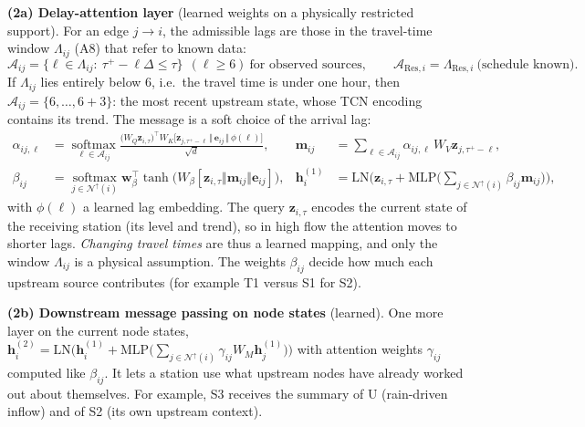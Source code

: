 \textbf{(2a) Delay-attention layer} (learned weights on a physically restricted support). For an
edge $j\to i$, the admissible lags are those in the travel-time window $\Lambda_{ij}$ (A8) that refer
to known data:
\begin{equation}
\mathcal{A}_{ij}=\big\{\ell\in\Lambda_{ij}:\ \tau^{+}-\ell\Delta\le\tau\big\}\ \ (\ell\ge6)\ \text{for observed sources},\qquad
\mathcal{A}_{\mathrm{Res},i}=\Lambda_{\mathrm{Res},i}\ \text{(schedule known)} .
\end{equation}
If $\Lambda_{ij}$ lies entirely below 6, i.e.\ the travel time is under one hour, then
$\mathcal{A}_{ij}=\{6,\dots,6+3\}$: the most recent upstream state, whose TCN encoding contains
its trend. The message is a soft choice of the arrival lag:
\begin{align}
\alpha_{ij,\ell}&=\operatorname*{softmax}_{\ell\in\mathcal{A}_{ij}}
\frac{\big(W_Q\mathbf{z}_{i,\tau}\big)^{\!\top}W_K\big[\mathbf{z}_{j,\tau^{+}-\ell}\,\Vert\,\mathbf{e}_{ij}\,\Vert\,\phi(\ell)\big]}{\sqrt d},
&\mathbf{m}_{ij}&=\sum_{\ell\in\mathcal{A}_{ij}}\alpha_{ij,\ell}\,W_V\mathbf{z}_{j,\tau^{+}-\ell},\\
\beta_{ij}&=\operatorname*{softmax}_{j\in\mathcal{N}^{\uparrow}(i)}\mathbf{w}_\beta^{\!\top}\tanh\!\big(W_\beta[\mathbf{z}_{i,\tau}\Vert\mathbf{m}_{ij}\Vert\mathbf{e}_{ij}]\big),
&\mathbf{h}^{(1)}_{i}&=\mathrm{LN}\Big(\mathbf{z}_{i,\tau}+\mathrm{MLP}\big(\textstyle\sum_{j\in\mathcal{N}^{\uparrow}(i)}\beta_{ij}\mathbf{m}_{ij}\big)\Big),
\end{align}
with $\phi(\ell)$ a learned lag embedding. The query $\mathbf{z}_{i,\tau}$ encodes the current
state of the receiving station (its level and trend), so in high flow the attention moves to
shorter lags. \emph{Changing travel times} are thus a learned mapping, and only the window
$\Lambda_{ij}$ is a physical assumption. The weights $\beta_{ij}$ decide how much each upstream source
contributes (for example T1 versus S1 for S2).

\textbf{(2b) Downstream message passing on node states} (learned). One more layer on the
current node states,
$\mathbf{h}^{(2)}_{i}=\mathrm{LN}\big(\mathbf{h}^{(1)}_{i}+\mathrm{MLP}\big(\sum_{j\in\mathcal{N}^{\uparrow}(i)}\gamma_{ij}W_M\mathbf{h}^{(1)}_{j}\big)\big)$
with attention weights $\gamma_{ij}$ computed like $\beta_{ij}$. It lets a station use what
upstream nodes have already worked out about themselves. For example, S3 receives the summary of U
(rain-driven inflow) and of S2 (its own upstream context).

